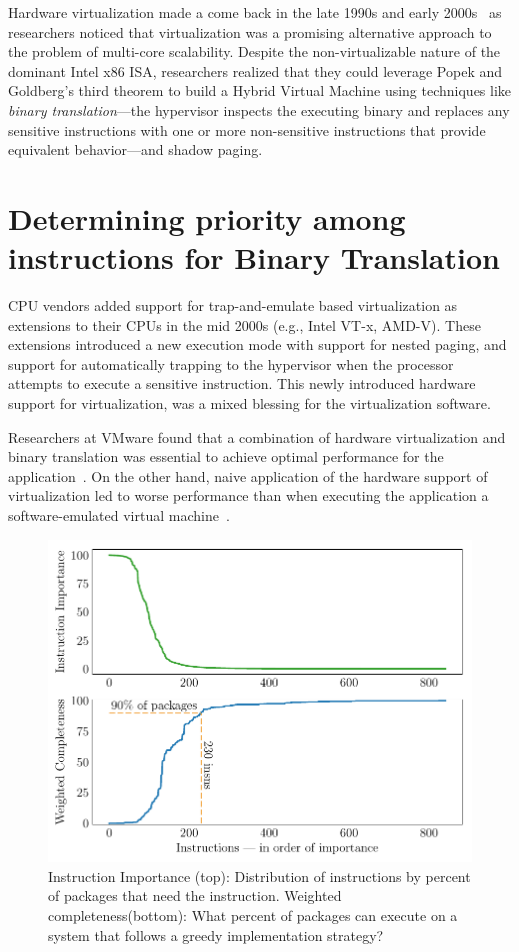 Hardware virtualization made a come back in the late 1990s and early
2000s~\cite{bugnion-disco, denali, xen} as researchers noticed that
virtualization was a promising alternative approach to the problem of
multi-core scalability. Despite the non-virtualizable nature of the dominant
Intel x86 ISA, researchers realized that they could leverage Popek and
Goldberg's third theorem to build a Hybrid Virtual Machine using techniques
like \emph{binary translation}---the hypervisor inspects the executing binary
and replaces any sensitive instructions with one or more non-sensitive
instructions that provide equivalent behavior---and shadow paging.

\section{Determining priority among instructions for Binary Translation}

CPU vendors added support for trap-and-emulate based virtualization as
extensions to their CPUs in the mid 2000s (e.g., Intel VT-x, AMD-V).
These extensions introduced a new execution mode with support for nested
paging, and support for automatically trapping to the hypervisor when the
processor attempts to execute a sensitive instruction. This newly introduced
hardware support for virtualization, was a mixed blessing for the
virtualization software.

Researchers at VMware found that a combination of hardware virtualization and
binary translation was essential to achieve optimal performance for the
application~\cite{vmware-esx-bt-plus-vtx}. On the other hand, naive
application of the hardware support of virtualization led to worse performance
than when executing the application a software-emulated virtual machine~\cite{Adams2006-qw}.

\begin{figure}[t!]
	\centering
	\includegraphics[width=0.5\linewidth]{figures/WCvMnem.pdf}
	\caption{ Instruction Importance (top): Distribution of instructions by percent of packages that need the instruction. Weighted completeness(bottom): What percent of packages can execute on a system that follows a greedy implementation strategy?}
	\label{fig:WCvMnem}
\end{figure}

